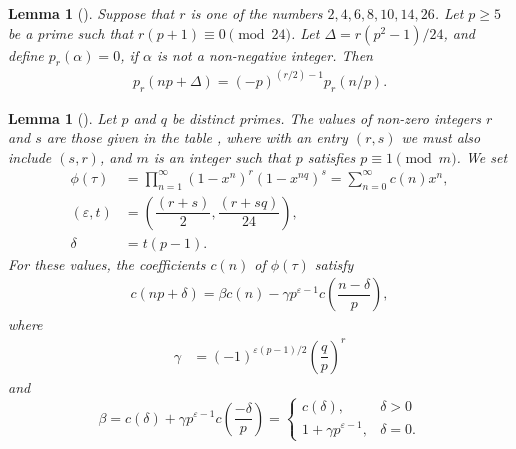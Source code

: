 \documentclass[11pt,a4paper]{article}
\numberwithin{equation}{section}
\theoremstyle{plain}
\newtheorem{lemma}[theorem]{Lemma}
\begin{document}
\begin{lemma}[{{\cite[Theorem~3]{newman55}}}]\label{lnew55}
Suppose that $r$ is one of the numbers $2,4,6,8,10, 14, 26$. Let $p\ge 5$ be a prime such that $r(p+1)\equiv0\pmod{24}$. Let $\Delta=r(p^2-1)/24$, and define $p_r(\alpha)=0$, if $\alpha$ is not a non-negative integer. Then 
\begin{align}
p_r(np+\Delta)=(-p)^{(r/2)-1}p_r(n/p).
\end{align}
\end{lemma}
\begin{lemma}[{{\cite[Theorem~3]{newman59}}}]\label{lnew59}
Let $p$ and $q$ be distinct primes. The values of non-zero integers $r$ and $s$ are those given in the table \cite{newman59}, where with an entry $(r,s)$ we must also include $(s,r)$, and $m$ is an integer such that $p$ satisfies $p\equiv 1\pmod m$. We set
	\begin{align*}
	\phi(\tau)&=\prod_{n=1}^{\infty}(1-x^n)^r(1-x^{nq})^s=\sum_{n=0}^{\infty}c(n)x^n,\\
	(\varepsilon, t)&= \displaystyle\left(\dfrac{(r+s)}{2}, \dfrac{(r+sq)}{24}\right),\\
	\delta&=t(p-1).
\end{align*}
For these values, the coefficients $c(n)$ of $\phi(\tau)$ satisfy 
\begin{align*}
c\left(np+\delta\right)=\beta c(n)-\gamma p^{\varepsilon-1}c\left(\dfrac{n-\delta}{p}\right),
\end{align*}
where
\begin{align*}
\gamma&= (-1)^{\varepsilon(p-1)/2}\left(\dfrac{q}{p}\right)^r
\end{align*}
and \[\beta=c(\delta)+\gamma p^{\varepsilon-1}c\left(\dfrac{-\delta}{p}\right)=\begin{cases}
c(\delta),& \delta>0\\[4pt]
1+\gamma p^{\varepsilon-1},& \delta=0.
\end{cases}\]

\end{lemma}
\end{document}
